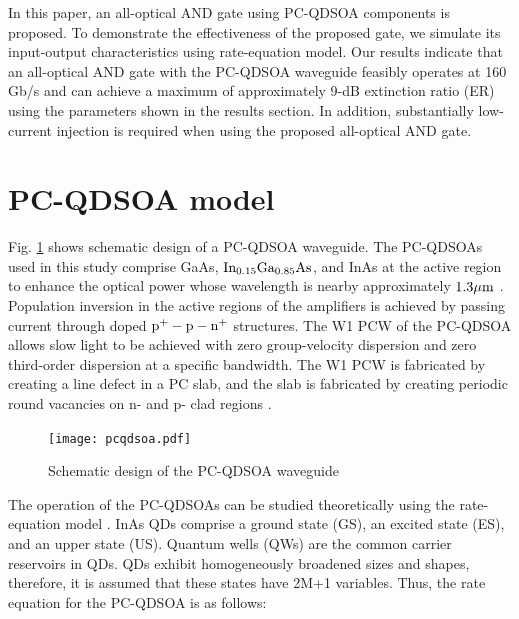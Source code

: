 \documentclass[twocolumn]{el-author}
\begin{document}
In this paper, an all-optical AND gate using PC-QDSOA components is proposed.  To demonstrate the effectiveness of the proposed gate, we simulate its input-output characteristics using rate-equation model. Our results indicate that an all-optical AND gate with the PC-QDSOA waveguide feasibly operates at 160 Gb/s and can achieve a maximum of approximately 9-dB extinction ratio (ER) using the parameters shown in the results section. In addition, substantially low-current injection is required when using the proposed all-optical AND gate.

\section{PC-QDSOA model}
Fig. {\ref{fig:pcqdsoa}} shows schematic design of a PC-QDSOA waveguide. The PC-QDSOAs used in this study comprise GaAs, ${\rm{In_{0.15}Ga_{0.85}As}}$, and InAs at the active region to enhance the optical power whose wavelength is nearby approximately ${\rm{1.3 \mu m}}$ {\cite{theory_of_qdsoa}}. Population inversion in the active regions of the amplifiers is achieved by passing current through doped ${\rm{p^{+}-p-n^{+}}}$ structures. The W1 PCW of the PC-QDSOA allows slow light to be achieved with zero group-velocity dispersion and zero third-order dispersion at a specific bandwidth. The W1 PCW is fabricated by creating a line defect in a PC slab, and the slab is fabricated by creating periodic round vacancies on n- and p- clad regions {\cite{how_to_create_pcw}}.

\begin{figure}[htbp]
\begin{center}
  \texttt{[image: pcqdsoa.pdf]}
  \caption{Schematic design of the PC-QDSOA waveguide}
  \label{fig:pcqdsoa}
\end{center}
\end{figure}
The operation of the PC-QDSOAs can be studied theoretically using the rate-equation model {\cite{pcqdsoa}}. InAs QDs comprise a ground state (GS), an excited state (ES), and an upper state (US). Quantum wells (QWs) are the common carrier reservoirs in QDs. QDs exhibit homogeneously broadened sizes and shapes, therefore, it is assumed that these states have 2M+1 variables. Thus, the rate equation for the PC-QDSOA is as follows:
\end{document}
